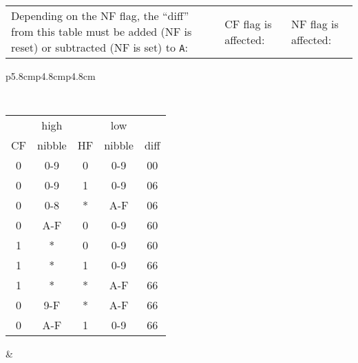 {
	\footnotesize

	\begin{tabular}{b{5.8cm}b{4.8cm}b{4.8cm}}
		Depending on the NF flag, the ``diff'' from this table must be added (NF is reset) or subtracted (NF is set) to {\tt A}:
		&
		CF flag is affected:
		&
		NF flag is affected: \\
	\end{tabular}

	\begin{tabular}{p{5.8cm}p{4.8cm}p{4.8cm}}

		{\tt
			\begin{tabular}[t]{c|c|c|c|c}
				   &  high   &    & low    &  \\
				CF &  nibble & HF & nibble & diff \\
				\hline
				0 & 0-9     &  0 & 0-9    &  00  \\
				0 & 0-9     &  1 & 0-9    &  06  \\
				0 & 0-8     &  * & A-F    &  06  \\
				0 & A-F     &  0 & 0-9    &  60  \\
				1 &  *      &  0 & 0-9    &  60  \\
				1 &  *      &  1 & 0-9    &  66  \\
				1 &  *      &  * & A-F    &  66  \\
				0 & 9-F     &  * & A-F    &  66  \\
				0 & A-F     &  1 & 0-9    &  66  \\
				\hline
			\end{tabular}
		}

		&


\end{tabular}}
